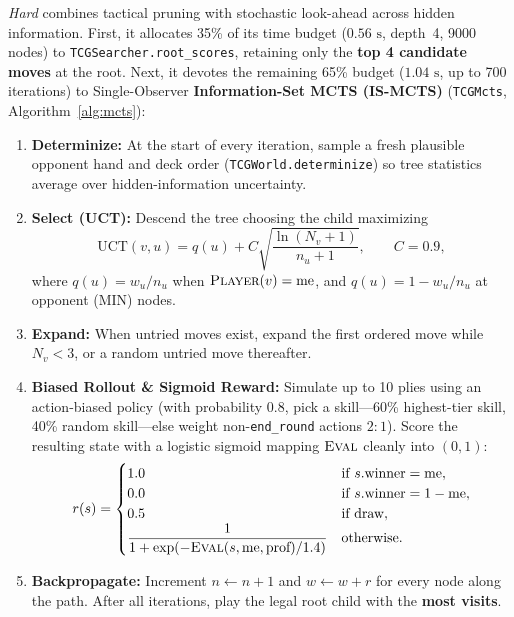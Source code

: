\documentclass[11pt,a4paper]{article}
\newcommand{\fn}[1]{\textsc{#1}}
\begin{document}
\emph{Hard} combines tactical pruning with stochastic look-ahead across hidden information. First, it allocates 35\% of its time budget ($0.56\text{ s}$, depth~4, 9000 nodes) to \texttt{TCGSearcher.root\_scores}, retaining only the \textbf{top 4 candidate moves} at the root. Next, it devotes the remaining 65\% budget ($1.04\text{ s}$, up to 700 iterations) to Single-Observer \textbf{Information-Set MCTS (IS-MCTS)} (\texttt{TCGMcts}, Algorithm~\ref{alg:mcts}):
\begin{enumerate}[leftmargin=1.4em, itemsep=1pt]
  \item \textbf{Determinize:} At the start of every iteration, sample a fresh plausible opponent hand and deck order (\texttt{TCGWorld.determinize}) so tree statistics average over hidden-information uncertainty.
  \item \textbf{Select (UCT):} Descend the tree choosing the child maximizing
  \begin{equation}
    \mathrm{UCT}(v, u) = q(u) + C\sqrt{\frac{\ln(N_v + 1)}{n_u + 1}}, \qquad C = 0.9,
    \label{eq:uct}
  \end{equation}
  where $q(u) = w_u / n_u$ when $\fn{Player}(v) = \text{me}$, and $q(u) = 1 - w_u / n_u$ at opponent (MIN) nodes.
  \item \textbf{Expand:} When untried moves exist, expand the first ordered move while $N_v < 3$, or a random untried move thereafter.
  \item \textbf{Biased Rollout \& Sigmoid Reward:} Simulate up to 10 plies using an action-biased policy (with probability $0.8$, pick a skill—60\% highest-tier skill, 40\% random skill—else weight non-\texttt{end\_round} actions $2:1$). Score the resulting state with a logistic sigmoid mapping $\fn{Eval}$ cleanly into $(0,1)$:
  \begin{equation}
    r(s) = \begin{cases}
      1.0 & \text{if } s.\text{winner} = \text{me}, \\
      0.0 & \text{if } s.\text{winner} = 1 - \text{me}, \\
      0.5 & \text{if draw}, \\
      \dfrac{1}{1 + \exp(-\fn{Eval}(s,\text{me},\text{prof}) / 1.4)} & \text{otherwise.}
    \end{cases}
    \label{eq:mcts-reward}
  \end{equation}
  \item \textbf{Backpropagate:} Increment $n \gets n+1$ and $w \gets w + r$ for every node along the path. After all iterations, play the legal root child with the \textbf{most visits}.
\end{enumerate}
\end{document}
